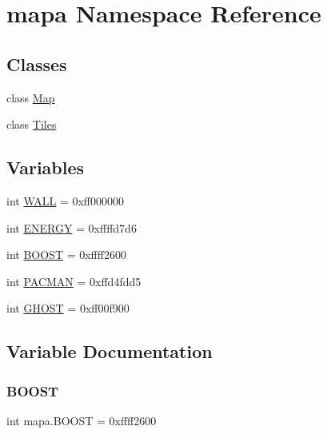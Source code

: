 \hypertarget{namespacemapa}{}\section{mapa Namespace Reference}
\label{namespacemapa}
\subsection*{Classes}
\begin{DoxyCompactItemize}
\item 
class \hyperlink{classmapa_1_1_map}{Map}
\item 
class \hyperlink{classmapa_1_1_tiles}{Tiles}
\end{DoxyCompactItemize}
\subsection*{Variables}
\begin{DoxyCompactItemize}
\item 
int \hyperlink{namespacemapa_a82bae2a869fd1d70e3e9c01a2c55ef6e}{W\+A\+LL} = 0xff000000
\item 
int \hyperlink{namespacemapa_a641795cf902521337d56a09a63b01b25}{E\+N\+E\+R\+GY} = 0xffffd7d6
\item 
int \hyperlink{namespacemapa_a96d5d11237510e976488f76b19ca631c}{B\+O\+O\+ST} = 0xffff2600
\item 
int \hyperlink{namespacemapa_a0274e0f2c16b5a277ed25947ce06c1a0}{P\+A\+C\+M\+AN} = 0xffd4fdd5
\item 
int \hyperlink{namespacemapa_a589af5349f9fe1bfd4135e69f60ebf10}{G\+H\+O\+ST} = 0xff00f900
\end{DoxyCompactItemize}


\subsection{Variable Documentation}
\mbox{\label{namespacemapa_a96d5d11237510e976488f76b19ca631c}} 
\subsubsection{\texorpdfstring{B\+O\+O\+ST}{BOOST}}
{\footnotesize\ttfamily int mapa.\+B\+O\+O\+ST = 0xffff2600}

\mbox{\label{namespacemapa_a641795cf902521337d56a09a63b01b25}} 
